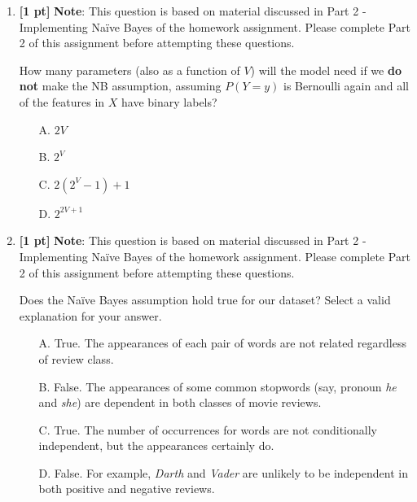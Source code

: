\documentclass{article}
\begin{document}
\begin{enumerate}
    \item \textbf{[1 pt]} \textbf{Note}: This question is based on material discussed in Part 2 - Implementing Na{\"i}ve Bayes of the homework assignment. Please complete Part 2 of this assignment before attempting these questions.
    
    How many parameters (also as a function of $V$) will the model need if we \textbf{do not} make the NB assumption, assuming $P(Y=y)$ is Bernoulli again and all of the features in $X$ have binary labels?
    \begin{itemize}
        \item[A.] $2V$
        \item[B.] $2^V$
        \item[C.] $2(2^V-1)+1$
        \item[D.] $2^{2V+1}$
    \end{itemize}
    \begin{tcolorbox}[width=\linewidth/3,height=1.5cm]
    \end{tcolorbox}
    \newpage
    
    \item \textbf{[1 pt]} \textbf{Note}: This question is based on material discussed in Part 2 - Implementing Na{\"i}ve Bayes of the homework assignment. Please complete Part 2 of this assignment before attempting these questions.
    
    Does the Na{\"i}ve Bayes assumption hold true for our dataset? Select a valid explanation for your answer.
    \begin{itemize}
        \item[A.] True. The appearances of each pair of words are not related regardless of review class.
        \item[B.] False. The appearances of some common stopwords (say, pronoun \textit{he} and \textit{she}) are dependent in both classes of movie reviews.
        \item[C.] True. The number of occurrences for words are not conditionally independent, but the appearances certainly do.
        \item[D.] False. For example, \textit{Darth} and \textit{Vader} are unlikely to be independent in both positive and negative reviews.
    \end{itemize}
    \begin{tcolorbox}[width=\linewidth/3,height=1.5cm]
    \end{tcolorbox}


\end{enumerate}
\end{document}
